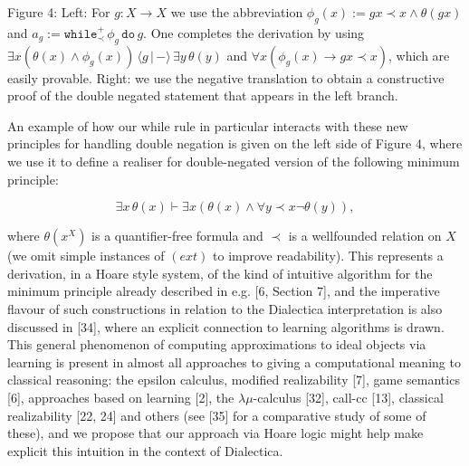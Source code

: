 Figure 4: Left: For $g:X\to X$ we use the abbreviation $\phi_{g}(x):=gx\prec x\wedge\theta(gx)$ and $a_{g}:=\mathtt{while}^{+}_{\prec}\,{\phi_{g}}\,\mathtt{do}\,{g}$. One completes the derivation by using ${\exists x(\theta(x)\wedge\phi_{g}(x))}\,{\langle{g}\,|\,{-}\rangle}\,{\exists
y\,\theta(y)}$ and $\forall x(\phi_{g}(x)\to gx\prec x)$, which are easily provable. Right: we use the negative translation to obtain a constructive proof of the double negated statement that appears in the left branch.\par
 
 
 
An example of how our while rule in particular interacts with these new principles for handling double negation is given on the left side of Figure 4, where we use it to define a realiser for double-negated version of the following minimum principle:\par
  
\par  \quad  \[\exists x\,\theta(x)\vdash\exists x\left(\theta(x)\wedge\forall y\prec x\neg\theta(y)\right),\]\quad  \quad  
  
where $\theta(x^{X})$ is a quantifier-free formula and $\prec$ is a wellfounded relation on $X$ (we omit simple instances of $(ext)$ to improve readability). This represents a derivation, in a Hoare style system, of the kind of intuitive algorithm for the minimum principle already described in e.g. [6, Section 7], and the imperative flavour of such constructions in relation to the Dialectica interpretation is also discussed in [34], where an explicit connection to learning algorithms is drawn. This general phenomenon of computing approximations to ideal objects via learning is present in almost all approaches to giving a computational meaning to classical reasoning: the epsilon calculus, modified realizability [7], game semantics [6], approaches based on learning [2], the $\lambda\mu$-calculus [32], call-cc [13], classical realizability [22, 24] and others (see [35] for a comparative study of some of these), and we propose that our approach via Hoare logic might help make explicit this intuition in the context of Dialectica.\par
 
 
 
